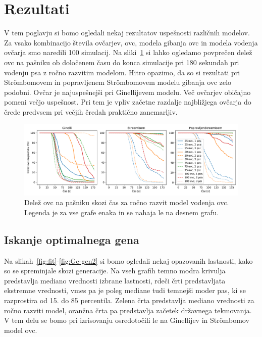 \section{Rezultati}

V tem poglavju si bomo ogledali nekaj rezultatov uspešnosti različnih modelov. Za vsako kombinacijo števila ovčarjev, ovc, modela gibanja ovc in modela vodenja ovčarja smo naredili 100 simulacij. Na sliki~\ref{fig:prezivetvena} si lahko ogledamo povprečen delež ovc na pašniku ob določenem času do konca simulacije pri 180 sekundah pri vodenju psa z ročno razvitim modelom. Hitro opazimo, da so si rezultati pri Str{\"o}mbomovem in popravljenem Str{\"o}mbomovem modelu gibanja ovc zelo podobni. Ovčar je najuspešnejši pri Ginellijevem modelu. Več ovčarjev običajno pomeni večjo uspešnost. Pri tem je vpliv začetne razdalje najbližjega ovčarja do črede predvsem pri večjih čredah praktično zanemarljiv.

\begin{figure}[ht]  %
	\centering
	\includegraphics[width=\textwidth]{../poglavja/grafi/prezivetvena-Voronoi.pdf}
	\caption[Delež ovc na pašniku skozi čas]{Delež ovc na pašniku skozi čas za ročno razvit model vodenja ovc. Legenda je za vse grafe enaka in se nahaja le na desnem grafu.} %
	\label{fig:prezivetvena}
\end{figure}

\subsection{Iskanje optimalnega gena}

Na slikah~\ref{fig:fit}-\ref{fig:Ge-gen2} si bomo ogledali nekaj opazovanih lastnosti, kako so se spreminjale skozi generacije. Na vseh grafih temno modra krivulja predstavlja mediano vrednosti izbrane lastnosti, rdeči črti predstavljata ekstremne vrednosti, vmes pa je poleg mediane tudi temnejši moder pas, ki se razprostira od 15. do 85 percentila. Zelena črta predstavlja mediano vrednosti za ročno razviti model, oranžna črta pa predstavlja začetek državnega tekmovanja. V tem delu se bomo pri izrisovanju osredotočili le na Ginellijev in Str{\"o}mbomov model ovc.

